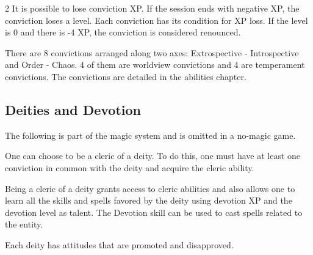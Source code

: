 \begin{multicols}{2}
It is possible to lose conviction XP. If the session ends with negative XP, the conviction loses a level. Each conviction has its condition for XP loss. If the level is 0 and there is -4 XP, the conviction is considered renounced.

There are 8 convictions arranged along two axes: Extrospective - Introspective and Order - Chaos. 4 of them are worldview convictions and 4 are temperament convictions. The convictions are detailed in the abilities chapter.

\subsection{\magic Deities and Devotion}

The following is part of the magic system and is omitted in a no-magic game.

One can choose to be a cleric of a deity. To do this, one must have at least one conviction in common with the deity and acquire the cleric ability.

Being a cleric of a deity grants access to cleric abilities and also allows one to learn all the skills and spells favored by the deity using devotion XP and the devotion level as talent. The Devotion skill can be used to cast spells related to the entity.

Each deity has attitudes that are promoted and disapproved.






\end{multicols}
